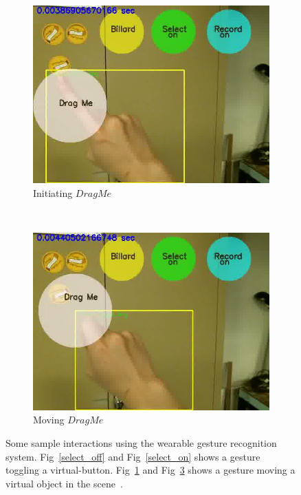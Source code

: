 \begin{figure}
\begin{subfigure}[b]{0.5\columnwidth}
        \centering
        \includegraphics[width=\columnwidth]{ch5/figs/45}
        \caption{Initiating $Drag Me$}\label{drag_init}
    \end{subfigure}~\begin{subfigure}[b]{0.5\columnwidth}
        \centering
        \includegraphics[width=\columnwidth]{ch5/figs/46}
        \caption{Moving $Drag Me$}\label{drag_me}
    \end{subfigure}
    \caption{Some sample interactions using the wearable gesture recognition system. Fig~\ref{select_off} and Fig~\ref{select_on} shows a gesture toggling a virtual-button. Fig~\ref{drag_init} and Fig~\ref{drag_me} shows a gesture moving a virtual object in the scene~\cite{lo2013augmediated}.}
\end{figure}

